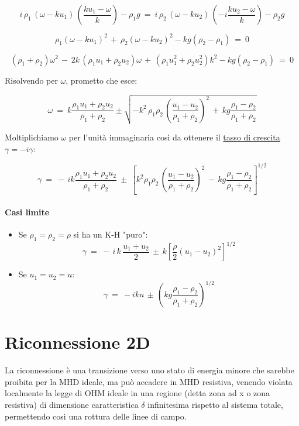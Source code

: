 \[
i\,\rho_1\, (\omega - ku_1)\, \left(\frac{ku_1-\omega}{k}\right)-\rho_1 g \ =\ i\, \rho_2\, (\omega - ku_2)\, \left(-i \frac{ku_2-\omega}{k}\right)-\rho_2 g
\]

\[\rho_1 (\omega - ku_1)^2\, +\, \rho_2 (\omega -ku_2)^2 - kg(\rho_2 - \rho_1)\ =\ 0
\]

\[(\rho_1 + \rho_2)\omega^2\, -\, 2k\,(\rho_1 u_1 + \rho_2 u_2)\omega\, +\, (\rho_1 u_1^2 + \rho_2 u_2^2)k^2 - kg(\rho_2 - \rho_1)\ =\ 0\]

Risolvendo per $\omega$, prometto che esce:

\[\omega\ =\ k\frac{\rho_1 u_1+ \rho_2 u_2}{\rho_1 + \rho_2} \pm \sqrt{-k^2\, \rho_1 \rho_2\, \left(\frac{u_1 - u_2}{\rho_1 + \rho_2}\right)^2 \, +\, kg\frac{\rho_1 - \rho_2}{\rho_1 + \rho_2}}\]

Moltiplichiamo $\omega$ per l'unità immaginaria così da ottenere il \underline{tasso di crescita} $\gamma=-i\gamma$:

\[
\gamma\ =\ -\,ik\frac{\rho_1 u_1+\rho_2 u_2}{\rho_1 + \rho_2}\ \pm \ \left[k^2\rho_1 \rho_2\, \left(\frac{u_1 - u_2}{\rho_1 + \rho_2}\right)^2\, -\, kg\frac{\rho_1 - \rho_2}{\rho_1 + \rho_2}\right]^{1/2}
\]

\paragraph{Casi limite}
\begin{itemize}
	\item Se $\rho_1=\rho_2=\rho$ si ha un K-H "puro":
	\[ \gamma\ =\ -\,i\,k\, \frac{u_1 + u_2}{2}\, \pm \, k\left[ \frac{\rho}{2}(u_1 - u_2)^2 \right]^{1/2} \]
	\item Se $u_1 = u_2 = u$:	
	\[\gamma\ =\ -iku\, \pm\, \left( k g\frac{\rho_1 - \rho_2}{\rho_1 + \rho_2}\right)^{1/2}\]
\end{itemize}





%
%
\section{Riconnessione 2D} 
La riconnessione è una transizione verso uno stato di energia minore che sarebbe proibita per la MHD ideale, ma può accadere in MHD resistiva, venendo violata localmente la legge di OHM ideale in una regione  (detta zona ad x  o zona resistiva) di dimensione caratteristica $\delta$  infinitesima rispetto al sistema totale, permettendo così una rottura delle linee di campo.

